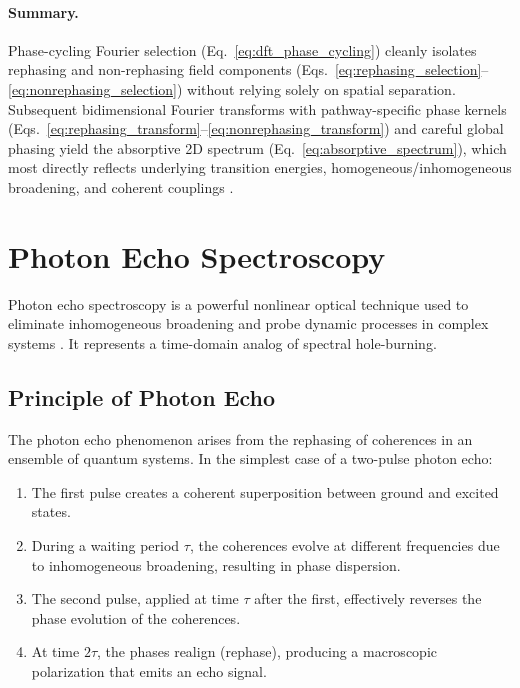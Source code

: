 \paragraph{Summary.}
\noindent Phase-cycling Fourier selection (Eq.~\eqref{eq:dft_phase_cycling}) cleanly isolates rephasing and non-rephasing field components (Eqs.~\eqref{eq:rephasing_selection}--\eqref{eq:nonrephasing_selection}) without relying solely on spatial separation. Subsequent bidimensional Fourier transforms with pathway-specific phase kernels (Eqs.~\eqref{eq:rephasing_transform}--\eqref{eq:nonrephasing_transform}) and careful global phasing yield the absorptive 2D spectrum (Eq.~\eqref{eq:absorptive_spectrum}), which most directly reflects underlying transition energies, homogeneous/inhomogeneous broadening, and coherent couplings \cite{Mukamel1995PrinciplesNonlinearOptical, Cho2009TwodimensionalOpticalSpectroscopy, GreenEtAl2024}.


\section{Photon Echo Spectroscopy}
\label{sec:photon_echo}

\noindent Photon echo spectroscopy is a powerful nonlinear optical technique used to eliminate inhomogeneous broadening and probe dynamic processes in complex systems \cite{HyblEtAl1998TwodimensionalElectronicSpectroscopy, Mukamel1995PrinciplesNonlinearOptical}. It represents a time-domain analog of spectral hole-burning.

\subsection{Principle of Photon Echo}
\label{subsec:echo_principle}

\noindent The photon echo phenomenon arises from the rephasing of coherences in an ensemble of quantum systems. In the simplest case of a two-pulse photon echo:

\begin{enumerate}
    \item The first pulse creates a coherent superposition between ground and excited states.
    \item During a waiting period $\tau$, the coherences evolve at different frequencies due to inhomogeneous broadening, resulting in phase dispersion.
    \item The second pulse, applied at time $\tau$ after the first, effectively reverses the phase evolution of the coherences.
    \item At time $2\tau$, the phases realign (rephase), producing a macroscopic polarization that emits an echo signal.
\end{enumerate}

